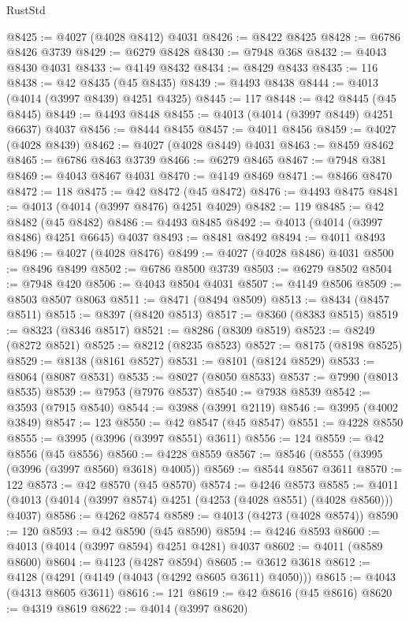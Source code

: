 \begin{lexlean}{RustStd}
\begin{coremodule}
@8425 := @4027 (@4028 @8412) @4031
@8426 := @8422 @8425
@8428 := @6786 @8426 @3739
@8429 := @6279 @8428
@8430 := @7948 @368
@8432 := @4043 @8430 @4031
@8433 := @4149 @8432
@8434 := @8429 @8433
@8435 := 116
@8438 := @42 @8435 (@45 @8435)
@8439 := @4493 @8438
@8444 := @4013 (@4014 (@3997 @8439) @4251 @4325)
@8445 := 117
@8448 := @42 @8445 (@45 @8445)
@8449 := @4493 @8448
@8455 := @4013 (@4014 (@3997 @8449) @4251 @6637) @4037
@8456 := @8444 @8455
@8457 := @4011 @8456
@8459 := @4027 (@4028 @8439)
@8462 := @4027 (@4028 @8449) @4031
@8463 := @8459 @8462
@8465 := @6786 @8463 @3739
@8466 := @6279 @8465
@8467 := @7948 @381
@8469 := @4043 @8467 @4031
@8470 := @4149 @8469
@8471 := @8466 @8470
@8472 := 118
@8475 := @42 @8472 (@45 @8472)
@8476 := @4493 @8475
@8481 := @4013 (@4014 (@3997 @8476) @4251 @4029)
@8482 := 119
@8485 := @42 @8482 (@45 @8482)
@8486 := @4493 @8485
@8492 := @4013 (@4014 (@3997 @8486) @4251 @6645) @4037
@8493 := @8481 @8492
@8494 := @4011 @8493
@8496 := @4027 (@4028 @8476)
@8499 := @4027 (@4028 @8486) @4031
@8500 := @8496 @8499
@8502 := @6786 @8500 @3739
@8503 := @6279 @8502
@8504 := @7948 @420
@8506 := @4043 @8504 @4031
@8507 := @4149 @8506
@8509 := @8503 @8507 @8063
@8511 := @8471 (@8494 @8509)
@8513 := @8434 (@8457 @8511)
@8515 := @8397 (@8420 @8513)
@8517 := @8360 (@8383 @8515)
@8519 := @8323 (@8346 @8517)
@8521 := @8286 (@8309 @8519)
@8523 := @8249 (@8272 @8521)
@8525 := @8212 (@8235 @8523)
@8527 := @8175 (@8198 @8525)
@8529 := @8138 (@8161 @8527)
@8531 := @8101 (@8124 @8529)
@8533 := @8064 (@8087 @8531)
@8535 := @8027 (@8050 @8533)
@8537 := @7990 (@8013 @8535)
@8539 := @7953 (@7976 @8537)
@8540 := @7938 @8539
@8542 := @3593 (@7915 @8540)
@8544 := @3988 (@3991 @2119)
@8546 := @3995 (@4002 @3849)
@8547 := 123
@8550 := @42 @8547 (@45 @8547)
@8551 := @4228 @8550
@8555 := @3995 (@3996 (@3997 @8551) @3611)
@8556 := 124
@8559 := @42 @8556 (@45 @8556)
@8560 := @4228 @8559
@8567 := @8546 (@8555 (@3995 (@3996 (@3997 @8560) @3618) @4005))
@8569 := @8544 @8567 @3611
@8570 := 122
@8573 := @42 @8570 (@45 @8570)
@8574 := @4246 @8573
@8585 := @4011 (@4013 (@4014 (@3997 @8574) @4251 (@4253 (@4028 @8551) (@4028 @8560))) @4037)
@8586 := @4262 @8574
@8589 := @4013 (@4273 (@4028 @8574))
@8590 := 120
@8593 := @42 @8590 (@45 @8590)
@8594 := @4246 @8593
@8600 := @4013 (@4014 (@3997 @8594) @4251 @4281) @4037
@8602 := @4011 (@8589 @8600)
@8604 := @4123 (@4287 @8594)
@8605 := @3612 @3618
@8612 := @4128 (@4291 (@4149 (@4043 (@4292 @8605 @3611) @4050)))
@8615 := @4043 (@4313 @8605 @3611)
@8616 := 121
@8619 := @42 @8616 (@45 @8616)
@8620 := @4319 @8619
@8622 := @4014 (@3997 @8620)

\end{coremodule}
\end{lexlean}

